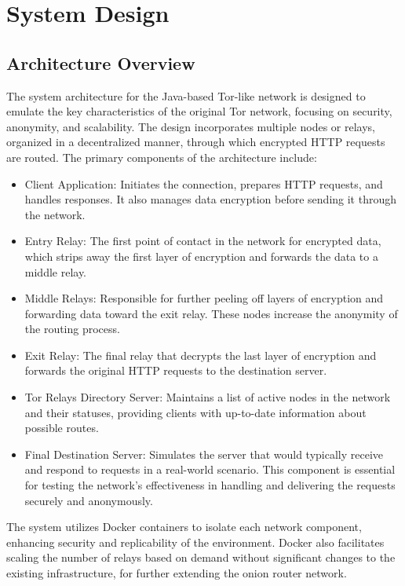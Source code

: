 \documentclass[sigconf]{acmart}
\begin{document}
\section{System Design}

\subsection{Architecture Overview}
The system architecture for the Java-based Tor-like network is designed to emulate the key characteristics of the original Tor network, focusing on security, anonymity, and scalability. The design incorporates multiple nodes or relays, organized in a decentralized manner, through which encrypted HTTP requests are routed. The primary components of the architecture include:

\begin{itemize}
    \item Client Application: Initiates the connection, prepares HTTP requests, and handles responses. It also manages data encryption before sending it through the network.
    \item Entry Relay: The first point of contact in the network for encrypted data, which strips away the first layer of encryption and forwards the data to a middle relay.
    \item Middle Relays: Responsible for further peeling off layers of encryption and forwarding data toward the exit relay. These nodes increase the anonymity of the routing process.
    \item Exit Relay: The final relay that decrypts the last layer of encryption and forwards the original HTTP requests to the destination server.
    \item Tor Relays Directory Server: Maintains a list of active nodes in the network and their statuses, providing clients with up-to-date information about possible routes.
    \item Final Destination Server: Simulates the server that would typically receive and respond to requests in a real-world scenario. This component is essential for testing the network’s effectiveness in handling and delivering the requests securely and anonymously.
\end{itemize}

The system utilizes Docker containers to isolate each network component, enhancing security and replicability of the environment. Docker also facilitates scaling the number of relays based on demand without significant changes to the existing infrastructure, for further extending the onion router network.
\end{document}
